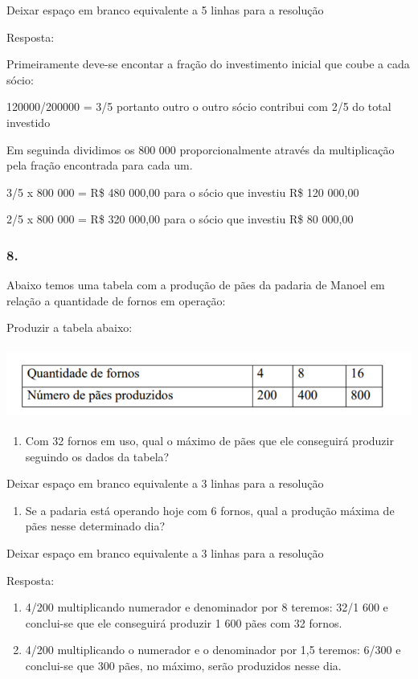 Deixar espaço em branco equivalente a 5 linhas para a resolução

Resposta:

Primeiramente deve-se encontar a fração do investimento inicial que
coube a cada sócio:

120000/200000 = 3/5 portanto outro o outro sócio contribui com 2/5 do
total investido

Em seguinda dividimos os 800 000 proporcionalmente através da
multiplicação pela fração encontrada para cada um.

3/5 x 800 000 = R\$ 480 000,00 para o sócio que investiu R\$ 120 000,00

2/5 x 800 000 = R\$ 320 000,00 para o sócio que investiu R\$ 80 000,00

\subsubsection{8.}\label{section-124}

Abaixo temos uma tabela com a produção de pães da padaria de Manoel em
relação a quantidade de fornos em operação:

Produzir a tabela abaixo:

\includegraphics[width=5.90556in,height=0.92222in]{media/image131.png}

\begin{enumerate}
\def\labelenumi{\alph{enumi})}
\item
  Com 32 fornos em uso, qual o máximo de pães que ele conseguirá
  produzir seguindo os dados da tabela?
\end{enumerate}

Deixar espaço em branco equivalente a 3 linhas para a resolução

\begin{enumerate}
\def\labelenumi{\alph{enumi})}
\item
  Se a padaria está operando hoje com 6 fornos, qual a produção máxima
  de pães nesse determinado dia?
\end{enumerate}

Deixar espaço em branco equivalente a 3 linhas para a resolução

Resposta:

\begin{enumerate}
\def\labelenumi{\alph{enumi})}
\item
  4/200 multiplicando numerador e denominador por 8 teremos: 32/1 600 e
  conclui-se que ele conseguirá produzir 1 600 pães com 32 fornos.
\item
  4/200 multiplicando o numerador e o denominador por 1,5 teremos: 6/300
  e conclui-se que 300 pães, no máximo, serão produzidos nesse dia.
\end{enumerate}

